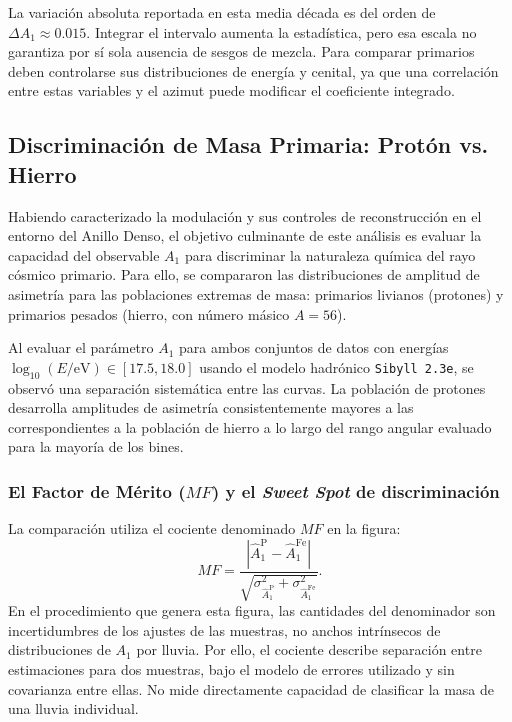 La variación absoluta reportada en esta media década es del orden de $\Delta A_1\approx0.015$. Integrar el intervalo aumenta la estadística, pero esa escala no garantiza por sí sola ausencia de sesgos de mezcla. Para comparar primarios deben controlarse sus distribuciones de energía y cenital, ya que una correlación entre estas variables y el azimut puede modificar el coeficiente integrado.

\subsection{Discriminación de Masa Primaria: Protón vs. Hierro}
\label{sec:discriminacion_masa}

Habiendo caracterizado la modulación y sus controles de reconstrucción en el entorno del Anillo Denso, el objetivo culminante de este análisis es evaluar la capacidad del observable $A_1$ para discriminar la naturaleza química del rayo cósmico primario. Para ello, se compararon las distribuciones de amplitud de asimetría para las poblaciones extremas de masa: primarios livianos (protones) y primarios pesados (hierro, con número másico $A=56$). 

Al evaluar el parámetro $A_1$ para ambos conjuntos de datos con energías $\log_{10}(E/\mathrm{eV}) \in [17.5, 18.0]$ usando el modelo hadrónico \texttt{Sibyll 2.3e}, se observó una separación sistemática entre las curvas. La población de protones desarrolla amplitudes de asimetría consistentemente mayores a las correspondientes a la población de hierro a lo largo del rango angular evaluado para la mayoría de los bines.

\subsubsection{El Factor de Mérito ($MF$) y el \textit{Sweet Spot} de discriminación}
\label{subsec:sweet_spot}

La comparación utiliza el cociente denominado $MF$ en la figura:
\begin{equation}
MF=\frac{|\widehat A_1^{\mathrm P}-\widehat A_1^{\mathrm{Fe}}|}
{\sqrt{\sigma_{\widehat A_1^{\mathrm P}}^2+\sigma_{\widehat A_1^{\mathrm{Fe}}}^2}}.
\end{equation}
En el procedimiento que genera esta figura, las cantidades del denominador son incertidumbres de los ajustes de las muestras, no anchos intrínsecos de distribuciones de $A_1$ por lluvia. Por ello, el cociente describe separación entre estimaciones para dos muestras, bajo el modelo de errores utilizado y sin covarianza entre ellas. No mide directamente capacidad de clasificar la masa de una lluvia individual.

